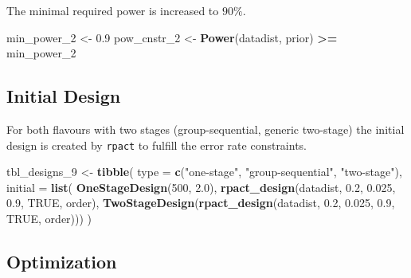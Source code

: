 \documentclass[
]{book}
\newenvironment{Shaded}{\begin{snugshade}}{\end{snugshade}}
\newcommand{\DataTypeTok}[1]{\textcolor[rgb]{0.13,0.29,0.53}{#1}}
\newcommand{\DecValTok}[1]{\textcolor[rgb]{0.00,0.00,0.81}{#1}}
\newcommand{\FloatTok}[1]{\textcolor[rgb]{0.00,0.00,0.81}{#1}}
\newcommand{\KeywordTok}[1]{\textcolor[rgb]{0.13,0.29,0.53}{\textbf{#1}}}
\newcommand{\NormalTok}[1]{#1}
\newcommand{\OperatorTok}[1]{\textcolor[rgb]{0.81,0.36,0.00}{\textbf{#1}}}
\newcommand{\OtherTok}[1]{\textcolor[rgb]{0.56,0.35,0.01}{#1}}
\newcommand{\StringTok}[1]{\textcolor[rgb]{0.31,0.60,0.02}{#1}}
\begin{document}
The minimal required power is increased to \(90\%\).

\begin{Shaded}
\begin{Highlighting}[]
\NormalTok{min_power_}\DecValTok{2}\NormalTok{ <-}\StringTok{ }\FloatTok{0.9}
\NormalTok{pow_cnstr_}\DecValTok{2}\NormalTok{ <-}\StringTok{ }\KeywordTok{Power}\NormalTok{(datadist, prior) }\OperatorTok{>=}\StringTok{ }\NormalTok{min_power_}\DecValTok{2}
\end{Highlighting}
\end{Shaded}

\hypertarget{initial-design-6}{%
\subsection{Initial Design}\label{initial-design-6}}

For both flavours with two stages (group-sequential, generic two-stage)
the initial design is created by \texttt{rpact} to fulfill the error rate constraints.

\begin{Shaded}
\begin{Highlighting}[]
\NormalTok{tbl_designs_}\DecValTok{9}\NormalTok{ <-}\StringTok{ }\KeywordTok{tibble}\NormalTok{(}
    \DataTypeTok{type    =} \KeywordTok{c}\NormalTok{(}\StringTok{"one-stage"}\NormalTok{, }\StringTok{"group-sequential"}\NormalTok{, }\StringTok{"two-stage"}\NormalTok{),}
    \DataTypeTok{initial =} \KeywordTok{list}\NormalTok{(}
        \KeywordTok{OneStageDesign}\NormalTok{(}\DecValTok{500}\NormalTok{, }\FloatTok{2.0}\NormalTok{),}
        \KeywordTok{rpact_design}\NormalTok{(datadist, }\FloatTok{0.2}\NormalTok{, }\FloatTok{0.025}\NormalTok{, }\FloatTok{0.9}\NormalTok{, }\OtherTok{TRUE}\NormalTok{, order),}
        \KeywordTok{TwoStageDesign}\NormalTok{(}\KeywordTok{rpact_design}\NormalTok{(datadist, }\FloatTok{0.2}\NormalTok{, }\FloatTok{0.025}\NormalTok{, }\FloatTok{0.9}\NormalTok{, }\OtherTok{TRUE}\NormalTok{, order))) )}
\end{Highlighting}
\end{Shaded}

\hypertarget{optimization-7}{%
\subsection{Optimization}\label{optimization-7}}
\end{document}
